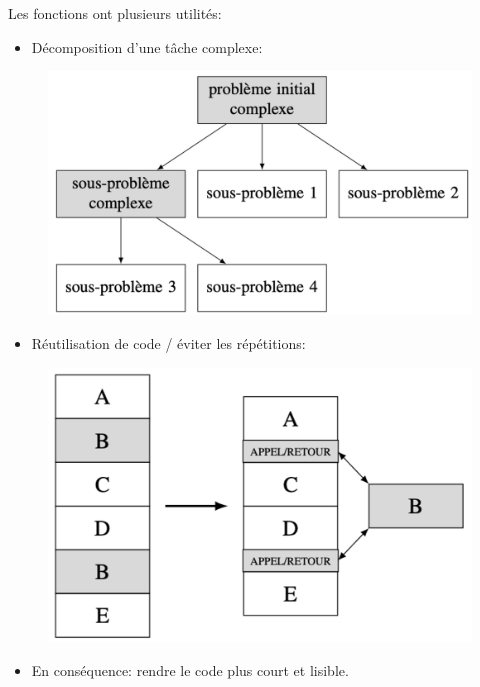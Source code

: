 \documentclass[12pt]{article}
\begin{document}
	Les fonctions ont plusieurs utilités:
	\begin{itemize}
		\item Décomposition d'une tâche complexe:
	\end{itemize}
	\begin{figure}[H]
		\centering
		\includegraphics[scale=0.3]{007_FoncDecomp.png}
	\end{figure}
	\begin{itemize}
		\item Réutilisation de code / éviter les répétitions:
	\end{itemize}
	\begin{figure}[H]
	\centering
	\includegraphics[scale=0.3]{008_FoncReutil.png}
	\end{figure}
	\begin{itemize}
		\item En conséquence: rendre le code plus court et lisible.
	\end{itemize}
	
\end{document}
